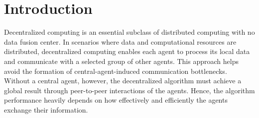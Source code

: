 \documentclass{article}
\theoremstyle{plain}
\theoremstyle{definition}
\begin{document}
\section{Introduction}
Decentralized computing \cite{tsitsiklis1986distributed,lopes2008diffusion,nedic2009distributed,dimakis2010gossip} is an essential subclass of distributed computing with no data fusion center.
{In scenarios where data and computational resources are distributed, decentralized computing enables each agent to process its local data and communicate with a selected group of other agents. This approach helps avoid the formation of central-agent-induced communication bottlenecks.} Without a central agent, however, the decentralized algorithm must achieve a global result through peer-to-peer interactions of the agents. Hence, the algorithm performance heavily depends on how effectively and efficiently the agents exchange their information.
\end{document}
